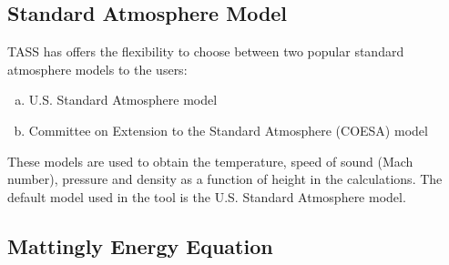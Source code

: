 \documentclass[pdftex,11pt,letter]{article}
\begin{document}
\subsection{Standard Atmosphere Model}
TASS has offers the flexibility to choose between two popular standard atmosphere models to the users:
\begin{enumerate}[(a)]
\item U.S. Standard Atmosphere model\cite{US}
\item  Committee on Extension to the Standard Atmosphere (COESA) model\cite{US}
\end{enumerate}
These models are used to obtain the temperature, speed of sound (Mach number), pressure and density as a function of height in the calculations. The default model used in the tool is the U.S. Standard Atmosphere model.

\subsection{Mattingly Energy Equation}
\end{document}
